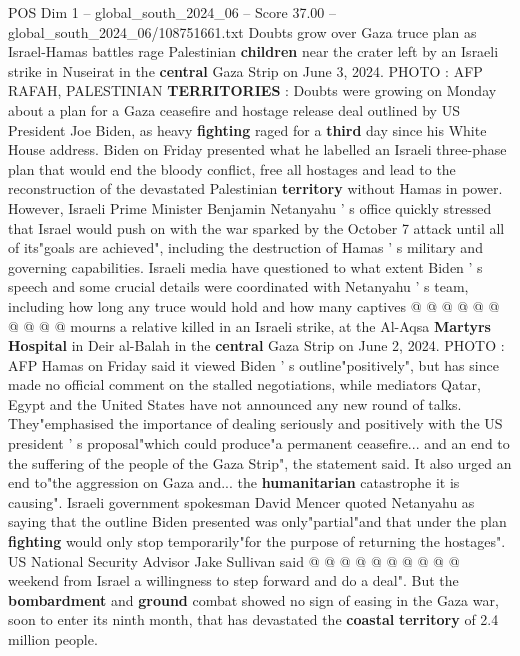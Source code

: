 \begin{textsample}{POS Dim 1 – global\_south\_2024\_06 – Score 37.00 – global\_south\_2024\_06/108751661.txt}  \label{ex:f1_pos_042}
Doubts grow over Gaza truce plan as Israel-Hamas battles rage Palestinian \textbf{children} near the crater left by an Israeli strike in Nuseirat in the \textbf{central} Gaza Strip on June 3, 2024.
PHOTO : AFP RAFAH, PALESTINIAN \textbf{TERRITORIES} : Doubts were growing on Monday about a plan for a Gaza ceasefire and hostage release deal outlined by US President Joe Biden, as heavy \textbf{fighting} raged for a \textbf{third} day since his White House address.
Biden on Friday presented what he labelled an Israeli three-phase plan that would end the bloody conflict, free all hostages and lead to the reconstruction of the devastated Palestinian \textbf{territory} without Hamas in power.
However, Israeli Prime Minister Benjamin Netanyahu ' s office quickly stressed that Israel would push on with the war sparked by the October 7 attack until all of its"goals are achieved", including the destruction of Hamas ' s military and governing capabilities.
Israeli media have questioned to what extent Biden ' s speech and some crucial details were coordinated with Netanyahu ' s team, including how long any truce would hold and how many captives @ @ @ @ @ @ @ @ @ @ mourns a relative killed in an Israeli strike, at the Al-Aqsa \textbf{Martyrs} \textbf{Hospital} in Deir al-Balah in the \textbf{central} Gaza Strip on June 2, 2024.
PHOTO : AFP Hamas on Friday said it viewed Biden ' s outline"positively", but has since made no official comment on the stalled negotiations, while mediators Qatar, Egypt and the United States have not announced any new round of talks.
They"emphasised the importance of dealing seriously and positively with the US president ' s proposal"which could produce"a permanent ceasefire... and an end to the suffering of the people of the Gaza Strip", the statement said.
It also urged an end to"the aggression on Gaza and... the \textbf{humanitarian} catastrophe it is causing".
Israeli government spokesman David Mencer quoted Netanyahu as saying that the outline Biden presented was only"partial"and that under the plan \textbf{fighting} would only stop temporarily"for the purpose of returning the hostages".
US National Security Advisor Jake Sullivan said @ @ @ @ @ @ @ @ @ @ weekend from Israel a willingness to step forward and do a deal".
But the \textbf{bombardment} and \textbf{ground} combat showed no sign of easing in the Gaza war, soon to enter its ninth month, that has devastated the \textbf{coastal} \textbf{territory} of 2.4 million people.

\end{textsample}
